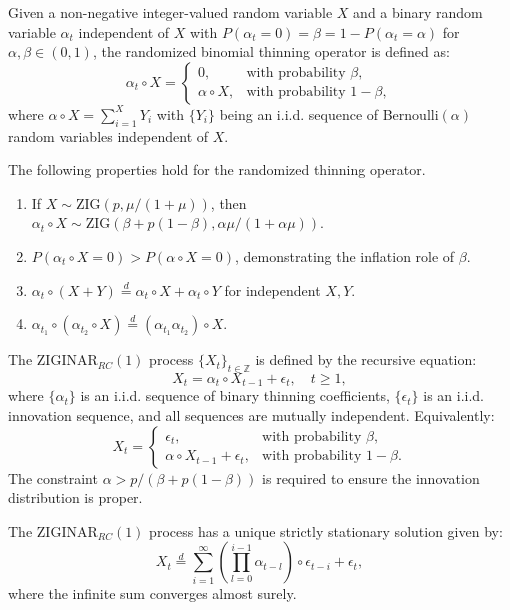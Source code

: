 \documentclass[twoside]{article}
\begin{document}
\begin{dfn}\label{dfn:randomthinning}
Given a non-negative integer-valued random variable $X$ and a binary random variable $\alpha_t$ independent of $X$ with $P(\alpha_t=0)=\beta=1-P(\alpha_t=\alpha)$ for $\alpha,\beta\in(0,1)$, the randomized binomial thinning operator is defined as:
\[
\alpha_t \circ X = \begin{cases}
0, & \text{with probability } \beta,\\
\alpha \circ X, & \text{with probability } 1-\beta,
\end{cases}
\]
where $\alpha \circ X = \sum_{i=1}^X Y_i$ with $\{Y_i\}$ being an i.i.d. sequence of Bernoulli$(\alpha)$ random variables independent of $X$.
\end{dfn}
The following properties hold for the randomized thinning operator.
\begin{enumerate}
\item If $X\sim\text{ZIG}(p,\mu/(1+\mu))$, then $\alpha_t\circ X\sim\text{ZIG}(\beta+p(1-\beta),\alpha\mu/(1+\alpha\mu))$.
\item $P(\alpha_t\circ X=0) > P(\alpha\circ X=0)$, demonstrating the inflation role of $\beta$.
\item $\alpha_t\circ (X+Y) \stackrel{d}{=} \alpha_t\circ X + \alpha_t\circ Y$ for independent $X,Y$.
\item $\alpha_{t_1}\circ(\alpha_{t_2}\circ X) \stackrel{d}{=} (\alpha_{t_1}\alpha_{t_2})\circ X$.
\end{enumerate}

\begin{dfn}\label{dfn:model}
The $\text{ZIGINAR}_{RC}(1)$ process $\{X_t\}_{t\in\mathbb{Z}}$ is defined by the recursive equation:
\[
X_t = \alpha_t \circ X_{t-1} + \epsilon_t, \quad t\geq 1,
\]
where $\{\alpha_t\}$ is an i.i.d. sequence of binary thinning coefficients, $\{\epsilon_t\}$ is an i.i.d. innovation sequence, and all sequences are mutually independent. Equivalently:
\[
X_t = \begin{cases}
\epsilon_t, & \text{with probability } \beta,\\
\alpha \circ X_{t-1} + \epsilon_t, & \text{with probability } 1-\beta.
\end{cases}
\]
The constraint $\alpha > p/(\beta+p(1-\beta))$ is required to ensure the innovation distribution is proper.
\end{dfn}

\begin{thm}\label{thm:stationarity}
The $\text{ZIGINAR}_{RC}(1)$ process has a unique strictly stationary solution given by:
\[
X_t \stackrel{d}{=} \sum_{i=1}^{\infty} \left(\prod_{l=0}^{i-1}\alpha_{t-l}\right) \circ \epsilon_{t-i} + \epsilon_t,
\]
where the infinite sum converges almost surely.
\end{thm}
\end{document}
